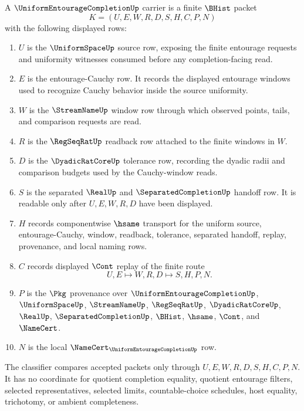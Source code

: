 \begin{definition}
\label{def:uniform-entourage-completion-carrier}
A $\UniformEntourageCompletionUp$ carrier is a finite $\BHist$ packet
$$
K=(U,E,W,R,D,S,H,C,P,N)
$$
with the following displayed rows:
\begin{enumerate}
\item $U$ is the $\UniformSpaceUp$ source row, exposing the finite entourage requests and uniformity witnesses consumed before any completion-facing read.
\item $E$ is the entourage-Cauchy row. It records the displayed entourage windows used to recognize Cauchy behavior inside the source uniformity.
\item $W$ is the $\StreamNameUp$ window row through which observed points, tails, and comparison requests are read.
\item $R$ is the $\RegSeqRatUp$ readback row attached to the finite windows in $W$.
\item $D$ is the $\DyadicRatCoreUp$ tolerance row, recording the dyadic radii and comparison budgets used by the Cauchy-window reads.
\item $S$ is the separated $\RealUp$ and $\SeparatedCompletionUp$ handoff row. It is readable only after $U,E,W,R,D$ have been displayed.
\item $H$ records componentwise $\hsame$ transport for the uniform source, entourage-Cauchy, window, readback, tolerance, separated handoff, replay, provenance, and local naming rows.
\item $C$ records displayed $\Cont$ replay of the finite route
$$
U,E \longmapsto W,R,D \longmapsto S,H,P,N .
$$
\item $P$ is the $\Pkg$ provenance over $\UniformEntourageCompletionUp$, $\UniformSpaceUp$, $\StreamNameUp$, $\RegSeqRatUp$, $\DyadicRatCoreUp$, $\RealUp$, $\SeparatedCompletionUp$, $\BHist$, $\hsame$, $\Cont$, and $\NameCert$.
\item $N$ is the local $\NameCert_{\UniformEntourageCompletionUp}$ row.
\end{enumerate}
The classifier compares accepted packets only through $U,E,W,R,D,S,H,C,P,N$. It has no coordinate for quotient completion equality, quotient entourage filters, selected representatives, selected limits, countable-choice schedules, host equality, trichotomy, or ambient completeness.
\end{definition}

